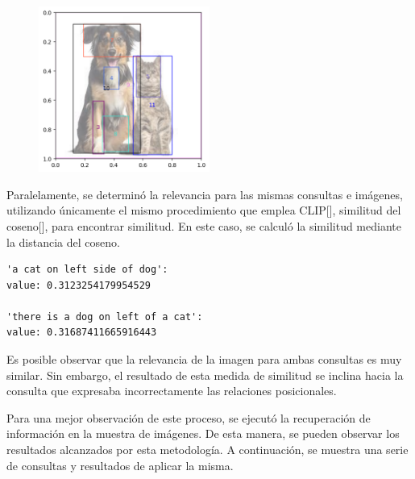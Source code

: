 \begin{figure}[H]
\centering
 \includegraphics[width=0.5\textwidth]{Graphics/dog_in_left.png}
 \caption{ }
 \label{fig:dog}
\end{figure}

Paralelamente, se determinó la relevancia para las mismas consultas e im\'agenes, utilizando únicamente el mismo procedimiento que emplea CLIP[\cite{clip}], similitud del coseno[\cite{git-clip}], para encontrar similitud. En este caso, se calculó la similitud mediante la distancia del coseno.

\begin{verbatim}
'a cat on left side of dog':
value: 0.3123254179954529

'there is a dog on left of a cat':
value: 0.31687411665916443
\end{verbatim}

Es posible observar que la relevancia de la imagen para ambas consultas es muy similar. Sin embargo, el resultado de esta medida de similitud se inclina hacia la consulta que expresaba incorrectamente las relaciones posicionales.

Para una mejor observación de este proceso, se ejecutó la recuperación de información en la muestra de im\'agenes. De esta manera, se pueden observar los resultados alcanzados por esta metodología. A continuación, se muestra una serie de consultas y resultados de aplicar la misma.

